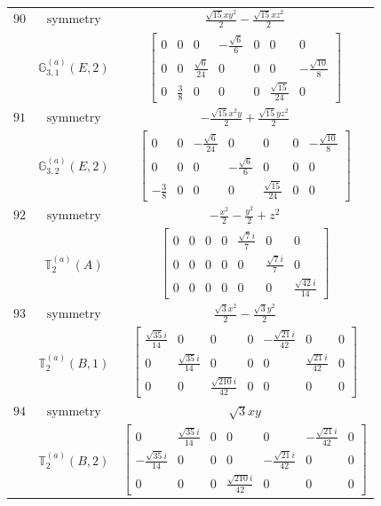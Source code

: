 \documentclass[fleqn,8pt,landscape]{jsarticle}
\begin{document}
\begin{longtable}{ccc}
$ 90 $ & $ \text{symmetry} $ & $ \frac{\sqrt{15} x y^{2}}{2} - \frac{\sqrt{15} x z^{2}}{2} $ \\
$  $ & $ \mathbb{G}_{3,1}^{(a)}(E,2) $ & $ \begin{bmatrix} 0 & 0 & 0 & - \frac{\sqrt{6}}{6} & 0 & 0 & 0 \\ 0 & 0 & \frac{\sqrt{6}}{24} & 0 & 0 & 0 & - \frac{\sqrt{10}}{8} \\ 0 & \frac{3}{8} & 0 & 0 & 0 & \frac{\sqrt{15}}{24} & 0 \end{bmatrix} $ \\ \hline
$ 91 $ & $ \text{symmetry} $ & $ - \frac{\sqrt{15} x^{2} y}{2} + \frac{\sqrt{15} y z^{2}}{2} $ \\
$  $ & $ \mathbb{G}_{3,2}^{(a)}(E,2) $ & $ \begin{bmatrix} 0 & 0 & - \frac{\sqrt{6}}{24} & 0 & 0 & 0 & - \frac{\sqrt{10}}{8} \\ 0 & 0 & 0 & - \frac{\sqrt{6}}{6} & 0 & 0 & 0 \\ - \frac{3}{8} & 0 & 0 & 0 & \frac{\sqrt{15}}{24} & 0 & 0 \end{bmatrix} $ \\ \hline
$ 92 $ & $ \text{symmetry} $ & $ - \frac{x^{2}}{2} - \frac{y^{2}}{2} + z^{2} $ \\
$  $ & $ \mathbb{T}_{2}^{(a)}(A) $ & $ \begin{bmatrix} 0 & 0 & 0 & 0 & \frac{\sqrt{7} i}{7} & 0 & 0 \\ 0 & 0 & 0 & 0 & 0 & \frac{\sqrt{7} i}{7} & 0 \\ 0 & 0 & 0 & 0 & 0 & 0 & \frac{\sqrt{42} i}{14} \end{bmatrix} $ \\ \hline
$ 93 $ & $ \text{symmetry} $ & $ \frac{\sqrt{3} x^{2}}{2} - \frac{\sqrt{3} y^{2}}{2} $ \\
$  $ & $ \mathbb{T}_{2}^{(a)}(B,1) $ & $ \begin{bmatrix} \frac{\sqrt{35} i}{14} & 0 & 0 & 0 & - \frac{\sqrt{21} i}{42} & 0 & 0 \\ 0 & \frac{\sqrt{35} i}{14} & 0 & 0 & 0 & \frac{\sqrt{21} i}{42} & 0 \\ 0 & 0 & \frac{\sqrt{210} i}{42} & 0 & 0 & 0 & 0 \end{bmatrix} $ \\ \hline
$ 94 $ & $ \text{symmetry} $ & $ \sqrt{3} x y $ \\
$  $ & $ \mathbb{T}_{2}^{(a)}(B,2) $ & $ \begin{bmatrix} 0 & \frac{\sqrt{35} i}{14} & 0 & 0 & 0 & - \frac{\sqrt{21} i}{42} & 0 \\ - \frac{\sqrt{35} i}{14} & 0 & 0 & 0 & - \frac{\sqrt{21} i}{42} & 0 & 0 \\ 0 & 0 & 0 & \frac{\sqrt{210} i}{42} & 0 & 0 & 0 \end{bmatrix} $ \\ \hline

\end{longtable}
\end{document}
